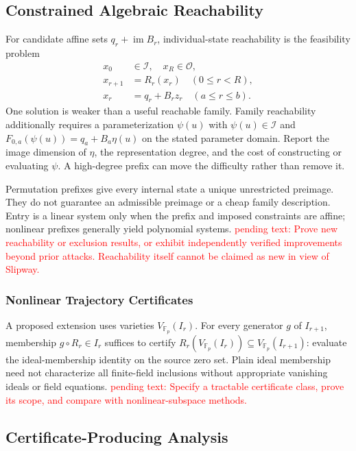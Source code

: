 \documentclass[conference]{IEEEtran}
\theoremstyle{definition}
\theoremstyle{plain}
\begin{document}
\subsection{Constrained Algebraic Reachability}
\label{sec:reachability}
For candidate affine sets $q_r+\operatorname{im}B_r$, individual-state
reachability is the feasibility problem
\begin{equation}
\begin{split}
x_0&\in\mathcal I,\quad x_R\in\mathcal O,\\
x_{r+1}&=R_r(x_r)\quad(0\le r<R),\\
x_r&=q_r+B_rz_r\quad(a\le r\le b).
\end{split}
\label{eq:reachability}
\end{equation}
One solution is weaker than a useful reachable family.
Family reachability additionally requires a parameterization $\psi(u)$
with $\psi(u)\in\mathcal I$ and
$F_{0,a}(\psi(u))=q_a+B_a\eta(u)$ on the stated parameter domain.
Report the image dimension of $\eta$, the representation degree, and
the cost of constructing or evaluating $\psi$. A high-degree prefix
can move the difficulty rather than remove it.

Permutation prefixes give every internal state a unique unrestricted
preimage. They do not guarantee an admissible preimage or a cheap family
description. Entry is a linear system only when the prefix and imposed
constraints are affine; nonlinear prefixes generally yield polynomial
systems.
\textcolor{red}{pending text: Prove new reachability or exclusion results,
or exhibit independently verified improvements beyond prior attacks.
Reachability itself cannot be claimed as new in view of Slipway.}
\subsubsection{Nonlinear Trajectory Certificates}
A proposed extension uses varieties $V_{\mathbb F_p}(I_r)$.
For every generator $g$ of $I_{r+1}$, membership
$g\circ R_r\in I_r$ suffices to certify
$R_r(V_{\mathbb F_p}(I_r))\subseteq V_{\mathbb F_p}(I_{r+1})$:
evaluate the ideal-membership identity on the source zero set.
Plain ideal membership need not characterize all finite-field inclusions
without appropriate vanishing ideals or field equations.
\textcolor{red}{pending text: Specify a tractable certificate class,
prove its scope, and compare with nonlinear-subspace methods.}
\subsection{Certificate-Producing Analysis}
\label{sec:framework}
\end{document}

